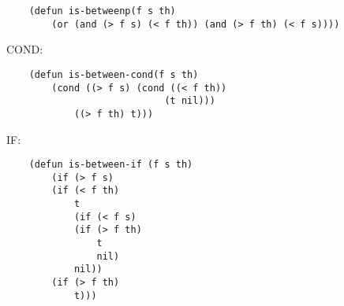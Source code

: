 \begin{enumerate}[wide=0pt]
	\begin{lstlisting}
	(defun is-betweenp(f s th)
		(or (and (> f s) (< f th)) (and (> f th) (< f s))))
	\end{lstlisting}

	COND:

	\begin{lstlisting}
	(defun is-between-cond(f s th)
		(cond ((> f s) (cond ((< f th))
							(t nil)))
			((> f th) t)))
	\end{lstlisting}

	\clearpage

	IF:

	\begin{lstlisting}
	(defun is-between-if (f s th)
		(if (> f s)
		(if (< f th)
			t
			(if (< f s)
			(if (> f th)
				t
				nil)
			nil))
		(if (> f th)
			t)))
	\end{lstlisting}



\end{enumerate}